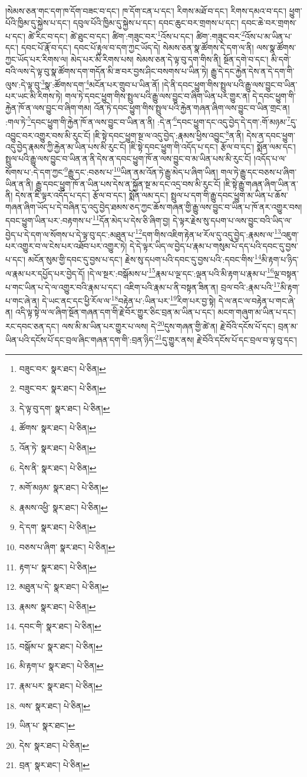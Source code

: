 །སེམས་ཅན་གང་དག་ཁ་དོག་བཟང་བ་དང་། ཁ་དོག་ངན་པ་དང་། རིགས་མཐོ་བ་དང་། རིགས་དམའ་བ་དང་། ཕྱུག་པོའི་ཁྱིམ་དུ་སྐྱེས་པ་དང་། དབུལ་པོའི་ཁྱིམ་དུ་སྐྱེས་པ་དང་། དབང་ཆུང་བར་གྲགས་པ་དང་། དབང་ཆེ་བར་གྲགས་པ་དང་། ཚེ་རིང་བ་དང་། ཚེ་ཐུང་བ་དང་། ཚིག་:གཟུང་བར་\footnote{བཟུང་བར་  སྣར་ཐང་།  པེ་ཅིན། }འོས་པ་དང་། ཚིག་:གཟུང་བར་\footnote{བཟུང་བར་  སྣར་ཐང་།  པེ་ཅིན། }འོས་པ་མ་ཡིན་པ་དང་། དབང་པོ་རྣོ་བ་དང་། དབང་པོ་རྟུལ་བ་དག་ཀྱང་ཡོད་དེ། སེམས་ཅན་སྣ་ཚོགས་དེ་དག་ལ་ནི། ལས་སྣ་ཚོགས་ཀྱང་ཡོད་པར་རིགས་ལ། མེད་པར་མི་རིགས་པས། སེམས་ཅན་དེ་ལྟ་བུ་དག་གིས་ནི། སྔོན་དགེ་བ་དང་། མི་དགེ་བའི་ལས་དེ་ལྟ་བུ་སྣ་ཚོགས་དག་གདོན་མི་ཟ་བར་བྱས་ཤིང་བསགས་པ་ཡིན་ཏེ། རྒྱུ་དེ་དང་རྐྱེན་དེས་ན་དེ་དག་གི་ལུས་:དེ་ལྟ་བུ་\footnote{དེ་ལྟ་བུ་དག་  སྣར་ཐང་།  པེ་ཅིན། }སྣ་:ཚོགས་དག་\footnote{ཚོགས་  སྣར་ཐང་།  པེ་ཅིན། }མངོན་པར་གྲུབ་པ་ཡིན་ནོ། །དེ་ནི་དབང་ཕྱུག་གིས་སྤྲུལ་པའི་རྒྱུ་ལས་བྱུང་བ་ཡིན་པར་ཡང་མི་རིགས་ཏེ། གལ་ཏེ་དབང་ཕྱུག་གིས་སྤྲུལ་པའི་རྒྱུ་ལས་བྱུང་བ་ཞིག་ཡིན་པར་གྱུར་ན། དེ་དབང་ཕྱུག་གི་རྐྱེན་ཁོ་ན་ལས་བྱུང་བ་ཞིག་གམ། འོན་ཏེ་དབང་ཕྱུག་གིས་སྤྲུལ་པའི་རྐྱེན་གཞན་ཞིག་ལས་བྱུང་བ་ཡིན་གྲང་ན། :གལ་ཏེ་\footnote{འོན་ཏེ་  སྣར་ཐང་།  པེ་ཅིན། }དབང་ཕྱུག་གི་རྐྱེན་ཁོ་ན་ལས་བྱུང་བ་ཡིན་ན་ནི། :དེ་ན་\footnote{དེས་ནི་  སྣར་ཐང་།  པེ་ཅིན། }དབང་ཕྱུག་དང་འདུ་བྱེད་དེ་དག་:གོ་མཉམ་\footnote{མགོ་མཉམ་  སྣར་ཐང་།  པེ་ཅིན། }དུ་འབྱུང་བར་འགྱུར་བས་མི་རུང་ངོ། །ཇི་སྟེ་དབང་ཕྱུག་སྔ་ལ་འདུ་བྱེད་:རྣམས་ཕྱིས་འབྱུང་\footnote{རྣམས་འཕྱི་  སྣར་ཐང་།  པེ་ཅིན། }ན་ནི། དེས་ན་དབང་ཕྱུག་འདུ་བྱེད་རྣམས་ཀྱི་རྐྱེན་མ་ཡིན་པས་མི་རུང་ངོ། །ཇི་སྟེ་དབང་ཕྱུག་གི་འདོད་པ་དང་། རྩོལ་བ་དང་། སྨོན་ལམ་དང་། སྤྲུལ་པའི་རྒྱུ་ལས་བྱུང་བ་ཡིན་ན་ནི་དེས་ན་དབང་ཕྱུག་ཁོ་ན་ལས་བྱུང་བ་མ་ཡིན་པས་མི་རུང་ངོ། །འདོད་པ་ལ་སོགས་པ་:དེ་དག་ཀྱང་\footnote{དེ་དག་  སྣར་ཐང་།  པེ་ཅིན། }རྒྱུ་དང་:བཅས་པ་\footnote{བཅས་པ་ཞིག་  སྣར་ཐང་།  པེ་ཅིན། }ཡིན་ནམ་འོན་ཏེ་རྒྱུ་མེད་པ་ཞིག་ཡིན། གལ་ཏེ་རྒྱུ་དང་བཅས་པ་ཞིག་ཡིན་ན་ནི། རྒྱུ་དབང་ཕྱུག་ཁོ་ན་ཡིན་པས་དེས་ན་སྐྱོན་སྔ་མ་དང་འདྲ་བས་མི་རུང་ངོ། །ཇི་སྟེ་རྒྱུ་གཞན་ཞིག་ཡིན་ན་ནི། དེས་ན་ཇི་ལྟར་འདོད་པ་དང་། རྩོལ་བ་དང་། སྨོན་ལམ་དང་། སྤྲུལ་པ་དག་གི་རྒྱུ་དབང་ཕྱུག་མ་ཡིན་པ་ཆོས་གཞན་ཞིག་ཡོད་པ་དེ་བཞིན་དུ་འདུ་བྱེད་ཐམས་ཅད་ཀྱང་ཆོས་གཞན་གྱི་རྒྱུ་ལས་བྱུང་བ་ཡིན་པ་ཁོ་ནར་འགྱུར་བས། དབང་ཕྱུག་ཡིན་པར་:བརྟགས་པ་\footnote{རྟག་པ་  སྣར་ཐང་།  པེ་ཅིན། }དོན་མེད་པ་དེས་ཅི་ཞིག་བྱ། དེ་ལྟར་རྗེས་སུ་དཔག་པ་ལས་བྱུང་བའི་ཡིད་ལ་བྱེད་པ་དེ་དག་ལ་སོགས་པ་དེ་ལྟ་བུ་དང་:མཐུན་པ་\footnote{མཐུན་པ་དེ་  སྣར་ཐང་།  པེ་ཅིན། }དག་གིས་འཇིག་རྟེན་ཕ་རོལ་དུ་འདུ་བྱེད་:རྣམས་ལ་\footnote{རྣམས་  སྣར་ཐང་།  པེ་ཅིན། }འཇུག་པར་འགྱུར་བ་ལ་ངེས་པར་འཐོབ་པར་འགྱུར་ཏེ། དེ་དེ་ལྟར་ཡིད་ལ་བྱེད་པ་རྣམ་པ་གསུམ་པོ་དད་པའི་དབང་དུ་བྱས་པ་དང་། མངོན་སུམ་གྱི་དབང་དུ་བྱས་པ་དང་། རྗེས་སུ་དཔག་པའི་དབང་དུ་བྱས་པའི་:དབང་གིས་\footnote{དབང་གི་  སྣར་ཐང་།  པེ་ཅིན། }མི་རྟག་པ་ཉིད་ལ་རྣམ་པར་དཔྱོད་པར་བྱེད་དོ། །དེ་ལ་སྔར་:བསྒོམས་པ་\footnote{བསྒོམ་པ་  སྣར་ཐང་།  པེ་ཅིན། }རྣམ་པ་ལྔ་དང་:ལྡན་པའི་མི་རྟག་པ་རྣམ་པ་\footnote{མི་རྟག་པ་  སྣར་ཐང་།  པེ་ཅིན། }ལྔ་བསྟན་པ་གང་ཡིན་པ་དེ་ལ་འགྱུར་བའི་རྣམ་པ་དང་། འཇིག་པའི་རྣམ་པ་ནི་བསྟན་ཟིན་ན། བྲལ་བའི་:རྣམ་པའི་\footnote{རྣམ་པར་  སྣར་ཐང་།  པེ་ཅིན། }མི་རྟག་པ་གང་ཞེ་ན། དེ་ཡང་ནང་དང་ཕྱི་རོལ་ལ་\footnote{ལས་  སྣར་ཐང་།  པེ་ཅིན། }བརྟེན་པ་:ཡིན་པར་\footnote{ཡིན་པ་  སྣར་ཐང་། }རིག་པར་བྱ་སྟེ། དེ་ལ་ནང་ལ་བརྟེན་པ་གང་ཞེ་ན། འདི་ལྟ་སྟེ་ལ་ལ་ཞིག་སྔོན་གཞན་དག་གི་རྗེ་བོར་གྱུར་ཅིང་བྲན་མ་ཡིན་པ་དང་། མངག་གཞུག་མ་ཡིན་པ་དང་། རང་དབང་ཅན་དང་། ལས་མི་མ་ཡིན་པར་གྱུར་པ་ལས། དེ་\footnote{དེས་  སྣར་ཐང་།  པེ་ཅིན། }དུས་གཞན་གྱི་ཚེ་ན། རྗེ་བོའི་དངོས་པོ་དང་། བྲན་མ་ཡིན་པའི་དངོས་པོ་དང་བྲལ་ཞིང་གཞན་དག་གི་:བྲན་ཉིད་\footnote{བྲན་  སྣར་ཐང་།  པེ་ཅིན། }དུ་གྱུར་ནས། རྗེ་བོའི་དངོས་པོ་དང་བྲལ་བ་ལྟ་བུ་དང་། 